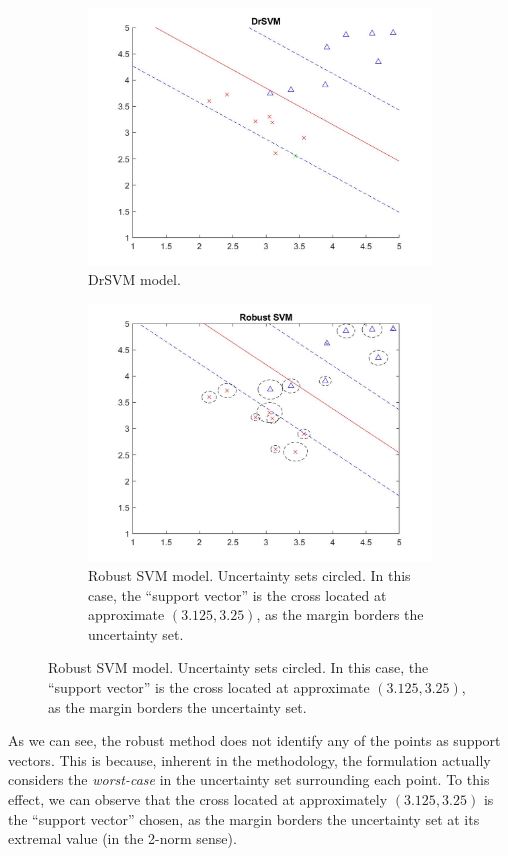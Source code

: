 \documentclass[11pt]{article}
\begin{document}
\begin{figure}[hbt!]
\begin{subfigure}{.5\textwidth}
		\includegraphics[width=\linewidth]{dr}
		\caption{DrSVM model.}
	\end{subfigure}
	\begin{subfigure}{.5\textwidth}
		\centering
		\captionsetup{font=footnotesize}
		\includegraphics[width=\linewidth]{robust}
		\caption{Robust SVM model. Uncertainty sets circled. In this case, the ``support vector'' is the cross located at approximate $(3.125,3.25)$, as the margin borders the uncertainty set.}
	\end{subfigure}
\end{figure}

As we can see, the robust method does not identify any of the points as support vectors. This is because, inherent in the methodology, the formulation actually considers the \emph{worst-case} in the uncertainty set surrounding each point. To this effect, we can observe that the cross located at approximately $(3.125,3.25)$ is the ``support vector'' chosen, as the margin borders the uncertainty set at its extremal value (in the 2-norm sense). 
\end{document}
